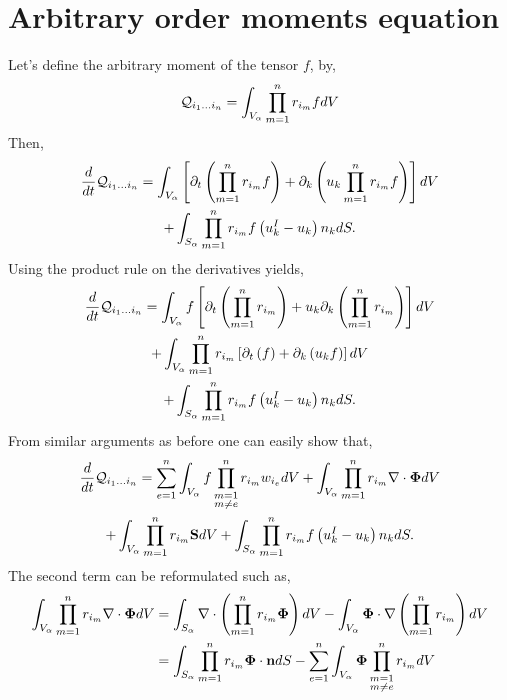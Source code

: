 
\section{Arbitrary order moments equation}
\label{ap:Moments_equations}

Let's define the arbitrary moment of the tensor $f$, by, 
\begin{equation*}
    \mathcal{Q}_{i_1\ldots i_n}
    = \int_{V_\alpha} 
    \prod_{m=1}^{n} r_{i_m} f dV
\end{equation*}
Then,
\begin{multline*}
    \frac{d}{d t} \mathcal{Q}_{i_1\ldots i_n}
    =\int_{V_\alpha} \left[ \partial_t \left(\prod_{m=1}^{n} r_{i_m}f\right) 
    + \partial_k \left(u_k \prod_{m=1}^{n} r_{i_m}f\right) \right]dV\\
    +\int_{S_\alpha} \prod_{m=1}^{n} r_{i_m} f \left(u^I_k - u_k\right) n_k dS.
\end{multline*}
Using the product rule on the derivatives yields, 
\begin{multline*}
    \frac{d}{d t} \mathcal{Q}_{i_1\ldots i_n}
    =\int_{V_\alpha} f \left[ \partial_t \left(\prod_{m=1}^{n} r_{i_m}\right) 
    + u_k \partial_k \left( \prod_{m=1}^{n} r_{i_m}\right) \right]dV\\
    +\int_{V_\alpha} \prod_{m=1}^{n} r_{i_m} \left[ \partial_t \left(f\right) 
    +  \partial_k \left(u_k f \right) \right]dV\\
    +\int_{S_\alpha} \prod_{m=1}^{n} r_{i_m} f \left(u^I_k - u_k\right) n_k dS.
\end{multline*}
From similar arguments as before one can easily show that, 
\begin{multline*}
    \frac{d}{d t} \mathcal{Q}_{i_1\ldots i_n}
    = \sum_{e=1}^{n} \int_{V_\alpha} f  \prod^{n}_{\substack{ m=1 \\   m \neq e}} r_{i_m} w_{i_e}dV
    +\int_{V_\alpha} \prod_{m=1}^{n} r_{i_m} \mathbf{\nabla}\cdot\mathbf{\Phi} dV\\
    + \int_{V_\alpha} \prod_{m=1}^{n} r_{i_m} \textbf{S} dV
    +\int_{S_\alpha} \prod_{m=1}^{n} r_{i_m} f \left(u^I_k - u_k\right) n_k dS.
\end{multline*}
The second term can be reformulated such as,
\begin{align*}
    \int_{V_\alpha} \prod_{m=1}^{n} r_{i_m} \mathbf{\nabla}\cdot\mathbf{\Phi} dV
    &= \int_{S_\alpha} \mathbf{\nabla} \cdot \left(\prod_{m=1}^{n} r_{i_m} \mathbf{\Phi} \right)dV
    - \int_{V_\alpha} \mathbf{\Phi} \cdot \mathbf{\nabla} \left(\prod_{m=1}^{n} r_{i_m} \right)dV\\
    &= \int_{S_\alpha} \prod_{m=1}^{n} r_{i_m} \mathbf{\Phi} \cdot \textbf{n}dS
    -\sum_{e=1}^{n} \int_{V_\alpha} \mathbf{\Phi}  \prod^{n}_{\substack{ m=1 \\m \neq e}} r_{i_m}  dV
\end{align*}
